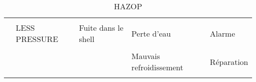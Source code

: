 \documentclass[10pt,a4paper]{article}
\begin{document}
\begin{landscape}
\begin{table}
\begin{tabular}{|p{2cm}|p{3cm}|p{4cm}|p{6cm}|p{5cm}|}
  & & & & \\

  & LESS PRESSURE & Fuite dans le shell & Perte d'eau & Alarme \\
 
  & & & & \\

  & & & Mauvais refroidissement & Réparation \\
  
   & & & & \\

 
 \hline


\end{tabular} 
\caption{HAZOP}
\end{table}
\end{landscape}
\end{document}
